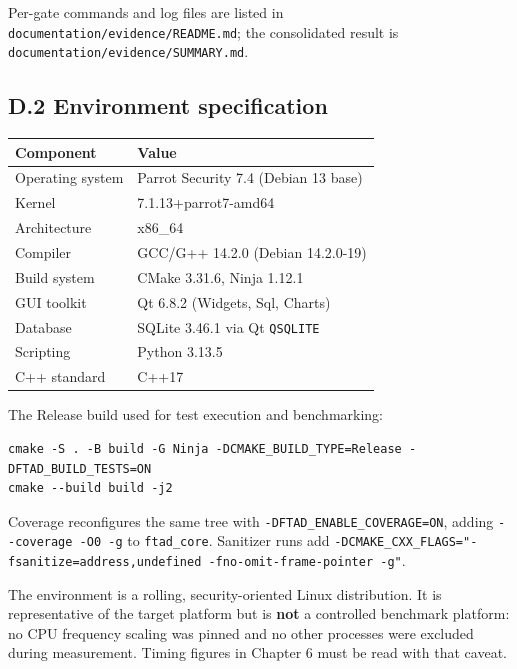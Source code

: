\documentclass[
  12pt,
]{report}
\begin{document}
Per-gate commands and log files are listed in
\texttt{documentation/\allowbreak{}evidence/\allowbreak{}README.md}; the consolidated result is
\texttt{documentation/\allowbreak{}evidence/\allowbreak{}SUMMARY.md}.

\subsection{D.2 Environment
specification}\label{d.2-environment-specification}

\begin{longtable}[]{@{}ll@{}}
\toprule\noalign{}
Component & Value \\
\midrule\noalign{}
\endhead
\bottomrule\noalign{}
\endlastfoot
Operating system & Parrot Security 7.4 (Debian 13 base) \\
Kernel & 7.1.13+parrot7-amd64 \\
Architecture & x86\_64 \\
Compiler & GCC/G++ 14.2.0 (Debian 14.2.0-19) \\
Build system & CMake 3.31.6, Ninja 1.12.1 \\
GUI toolkit & Qt 6.8.2 (Widgets, Sql, Charts) \\
Database & SQLite 3.46.1 via Qt \texttt{QSQLITE} \\
Scripting & Python 3.13.5 \\
C++ standard & C++17 \\
\end{longtable}

The Release build used for test execution and benchmarking:

\begin{verbatim}
cmake -S . -B build -G Ninja -DCMAKE_BUILD_TYPE=Release -DFTAD_BUILD_TESTS=ON
cmake --build build -j2
\end{verbatim}

Coverage reconfigures the same tree with
\texttt{-DFTAD\_ENABLE\_COVERAGE=ON}, adding
\texttt{-\/\allowbreak{}-coverage\ -O0\ -g} to \texttt{ftad\_core}. Sanitizer runs
add
\texttt{-DCMAKE\_CXX\_FLAGS="-fsanitize=address,undefined\ -fno-omit-frame-pointer\ -g"}.

The environment is a rolling, security-oriented Linux distribution. It
is representative of the target platform but is \textbf{not} a
controlled benchmark platform: no CPU frequency scaling was pinned and
no other processes were excluded during measurement. Timing figures in
Chapter 6 must be read with that caveat.

\clearpage
\end{document}
